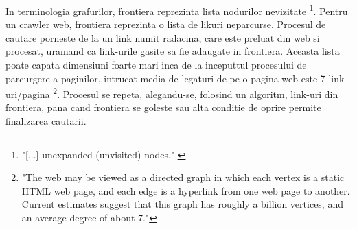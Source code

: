 In terminologia grafurilor, frontiera reprezinta lista nodurilor nevizitate \footnote{"[...] unexpanded (unvisited) nodes." \cite{PantSrinivasanMenczer} }. Pentru un crawler web, frontiera reprezinta o lista de likuri neparcurse. Procesul de cautare porneste de la un link numit radacina, care este preluat din web si procesat, uramand ca link-urile gasite sa fie adaugate in frontiera. Aceasta lista poate capata dimensiuni foarte mari inca de la inceputtul procesului de parcurgere a paginilor, intrucat media de legaturi de pe o pagina web este 7 link-uri/pagina \footnote{"The web  may  be  viewed  as  a  directed  graph  in  which each vertex is a static HTML web page, and each edge is a hyperlink from one web page to another. Current estimates suggest that this graph has roughly a billion vertices, and an average degree of about 7."\cite{StochasticModels}}. Procesul se repeta, alegandu-se, folosind un algoritm, link-uri din frontiera, pana cand frontiera se goleste sau alta conditie de oprire permite finalizarea cautarii.
\\